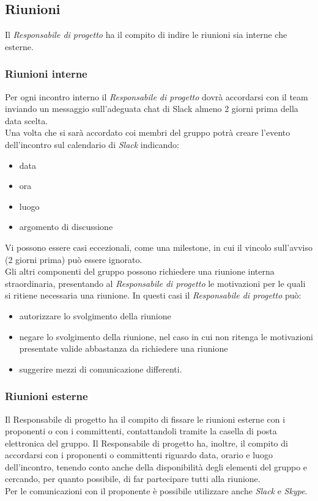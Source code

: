 \subsection{Riunioni}
Il \emph{ \emph{Responsabile}  di progetto} ha il compito di indire le riunioni sia interne che esterne.
\subsubsection{Riunioni interne}
Per ogni incontro interno il \emph{ \emph{Responsabile}  di progetto} dovrà
accordarsi con il team inviando un messaggio sull'adeguata chat di
Slack almeno 2 giorni prima della data scelta.\\ 
Una volta che si sarà accordato coi membri del gruppo potrà creare l'evento dell'incontro sul calendario di \emph{Slack} indicando:
\begin{itemize}
	\item data\item ora \item luogo\item argomento di discussione
\end{itemize}
Vi possono essere casi eccezionali, come una milestone, in cui il vincolo sull'avviso (2 giorni prima) può essere ignorato.\\
Gli altri componenti del gruppo possono richiedere una riunione
interna straordinaria, presentando al \emph{ \emph{Responsabile}  di
	progetto} le motivazioni per le quali si ritiene necessaria una
riunione. In questi casi il \emph{ \emph{Responsabile}  di progetto} può: 
\begin{itemize}
	\item autorizzare lo svolgimento della riunione
	\item negare lo
	svolgimento della riunione, nel caso in cui non ritenga le 
	motivazioni presentate valide abbastanza da richiedere una
	riunione
	\item suggerire mezzi di comunicazione differenti. 
\end{itemize}

\subsubsection{Riunioni esterne}
Il Responsabile di progetto ha il compito di fissare le riunioni esterne con i proponenti o con i
committenti, contattandoli tramite la casella di posta elettronica del gruppo.
Il Responsabile di progetto ha, inoltre, il compito di accordarsi con i proponenti o committenti riguardo data, orario e luogo dell’incontro, tenendo conto anche della disponibilità degli elementi del gruppo e cercando, per quanto possibile, di far partecipare tutti alla riunione. \\
Per le comunicazioni con il proponente è possibile utilizzare anche \emph{Slack} e \emph{Skype}.

